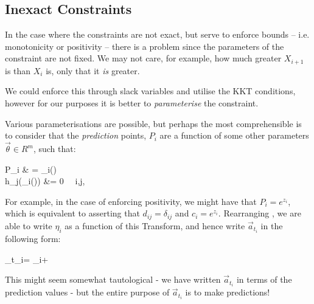 \documentclass[]{article}
\newcommand\T[1][i]{\mathcal{T}_{#1}}
\def\ai{\vec{a}_{t_i}}
\def\vi{\vec{v}_i}
\def\wi{\vec{w}}
\begin{document}
		\subsection{Inexact Constraints}

			In the case where the constraints are not exact, but serve to enforce bounds -- i.e. monotonicity or positivity -- there is a problem since the parameters of the constraint are not fixed. We may not care, for example, how much greater $X_{i+1}$ is than $X_i$ is, only that it \textit{is} greater. 

			We could enforce this through slack variables and utilise the KKT conditions, however for our purposes it is better to \textit{parameterise} the constraint. 

			Various parameterisations are possible, but perhaps the most comprehensible is to consider that the \textit{prediction} points, $P_i$ are a function of some other parameters $\vec{\theta} \in R^m$, such that:
			\begin{spalign}
				P_i & = \T(\vec{\theta})
				\\
				h_j(\T(\vec{\theta})) &= 0 ~\forall~i,j, \vec{\theta}
			\end{spalign}
			For example, in the case of enforcing positivity, we might have that $P_i = e^{z_i}$, which is equivalent to asserting that $d_{ij} = \delta_{ij}$ and $c_i = e^{z_i}$. Rearranging , we are able to write $\eta_i$ as a function of this Transform, and hence write $\ai$ in the following form:
			\begin{spalign}
				\ai = \vi +  \wi \label{E:Reparam}
			\end{spalign}
			This might seem somewhat tautological - we have written $\ai$ in terms of the prediction values - but the entire purpose of $\ai$ is to make predictions!
\end{document}
